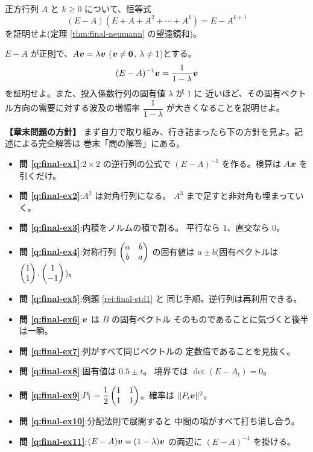 \begin{mondai}[証明]\label{q:final-ex10}
正方行列 $A$ と $k \ge 0$ について、恒等式
\[
(E - A)(E + A + A^2 + \cdots + A^k) = E - A^{k+1}
\]
を証明せよ(定理 \ref{thm:final-neumann} の望遠鏡和)。
\end{mondai}

\begin{mondai}[証明]\label{q:final-ex11}
$E - A$ が正則で、$A\bm{v} = \lambda\bm{v}$
($\bm{v} \neq \bm{0}$, $\lambda \neq 1$)とする。
\[
(E - A)^{-1}\bm{v} = \frac{1}{1 - \lambda}\bm{v}
\]
を証明せよ。また、投入係数行列の固有値 $\lambda$ が $1$ に
近いほど、その固有ベクトル方向の需要に対する波及の増幅率
$\dfrac{1}{1 - \lambda}$ が大きくなることを説明せよ。
\end{mondai}

\bigskip
{\small
\noindent\textbf{【章末問題の方針】}\quad
まず自力で取り組み、行き詰まったら下の方針を見よ。記述による完全解答は
巻末「問の解答」にある。
\begin{itemize}
\item \textbf{問 \ref{q:final-ex1}}:$2 \times 2$ の逆行列の公式で
$(E - A)^{-1}$ を作る。検算は $A\bm{x}$ を引くだけ。
\item \textbf{問 \ref{q:final-ex2}}:$A^2$ は対角行列になる。
$A^3$ まで足すと非対角も埋まっていく。
\item \textbf{問 \ref{q:final-ex3}}:内積をノルムの積で割る。
平行なら $1$、直交なら $0$。
\item \textbf{問 \ref{q:final-ex4}}:対称行列
$\begin{pmatrix}a & b \\ b & a\end{pmatrix}$ の固有値は $a \pm b$(固有ベクトルは
$\begin{pmatrix}1 \\ 1\end{pmatrix}, \begin{pmatrix}1 \\ -1\end{pmatrix}$)。
\item \textbf{問 \ref{q:final-ex5}}:例題 \ref{rei:final-std1} と
同じ手順。逆行列は再利用できる。
\item \textbf{問 \ref{q:final-ex6}}:$\bm{v}$ は $B$ の固有ベクトル
そのものであることに気づくと後半は一瞬。
\item \textbf{問 \ref{q:final-ex7}}:列がすべて同じベクトルの
定数倍であることを見抜く。
\item \textbf{問 \ref{q:final-ex8}}:固有値は $0.5 \pm t$。
境界では $\det(E - A_t) = 0$。
\item \textbf{問 \ref{q:final-ex9}}:$P_1 = \dfrac{1}{2}
\begin{pmatrix}1 & 1 \\ 1 & 1\end{pmatrix}$。確率は $\|P_i\bm{v}\|^2$。
\item \textbf{問 \ref{q:final-ex10}}:分配法則で展開すると
中間の項がすべて打ち消し合う。
\item \textbf{問 \ref{q:final-ex11}}:$(E - A)\bm{v} =
(1 - \lambda)\bm{v}$ の両辺に $(E - A)^{-1}$ を掛ける。
\end{itemize}
}


